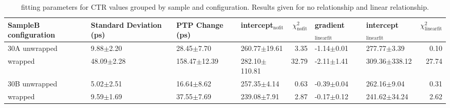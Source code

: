 \begin{table}
\caption{\label{tab:ctrfitresults} fitting parameters for CTR values grouped by sample and configuration. Results given for no relationship and linear relationship.}
\begin{tabular}{llllrllr}
\hline
SampleB configuration & Standard Deviation (ps) & PTP Change (ps) & intercept$_\text{nofit}$ &  $\chi^2_\text{nofit}$ & gradient$_\text{linearfit}$ & intercept$_\text{linearfit}$ &  $\chi^2_\text{linearfit}$ \\
\hline
30A     unwrapped     &   9.88$\pm$2.20 &    28.45$\pm$7.70 &   260.77$\pm$19.61 &                   3.35 &      -1.14$\pm$0.01 &    277.77$\pm$3.39 &                    0.10 \\
        wrapped       &  48.09$\pm$2.28 &  158.47$\pm$12.39 &  282.10$\pm$110.81 &                  32.79 &      -2.11$\pm$1.41 &  309.36$\pm$338.12 &                   27.74 \\
30B     unwrapped     &   5.02$\pm$2.51 &    16.64$\pm$8.62 &    257.35$\pm$4.14 &                   0.63 &      -0.39$\pm$0.04 &    262.16$\pm$9.04 &                    0.31 \\
        wrapped       &   9.59$\pm$1.69 &    37.55$\pm$7.69 &    239.08$\pm$7.91 &                   2.87 &      -0.17$\pm$0.12 &   241.62$\pm$34.24 &                    2.62 \\
\hline
\end{tabular}
\end{table}


